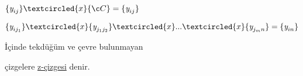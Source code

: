\documentclass[11pt]{amsbook}
\begin{document}
\begin{theorem}
    
    $\{\textit{y}_{ij}\}\textcircled{x}\{Ç\}=\{\textit{y}_{ij}\}$
    
\end{theorem}

\begin{theorem}
    
    $\{\textit{y}_{ij_{1}}\}\textcircled{x}\{\textit{y}_{j_{1}j_{2}}\}\textcircled{x}...\textcircled{x}\{\textit{y}_{j_{m}n}\}=\{\textit{y}_{in}\}$
    
\end{theorem}

\begin{definition}
    
    İçinde tekdüğüm ve çevre bulunmayan\par
    \hspace{2cm} çizgelere \underline{z-çizgesi} denir.

\end{definition}
\end{document}
